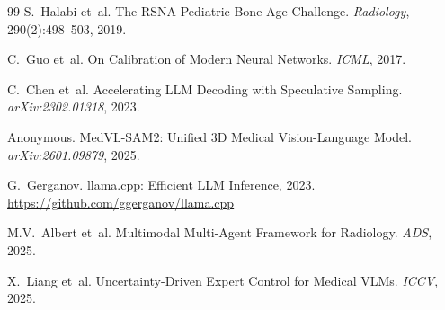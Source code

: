 \documentclass[10pt,twocolumn]{article}
\begin{document}
\begin{thebibliography}{99}
S.~Halabi et~al.
The RSNA Pediatric Bone Age Challenge.
\emph{Radiology}, 290(2):498--503, 2019.

C.~Guo et~al.
On Calibration of Modern Neural Networks.
\emph{ICML}, 2017.

C.~Chen et~al.
Accelerating LLM Decoding with Speculative Sampling.
\emph{arXiv:2302.01318}, 2023.

Anonymous.
MedVL-SAM2: Unified 3D Medical Vision-Language Model.
\emph{arXiv:2601.09879}, 2025.

G.~Gerganov.
llama.cpp: Efficient LLM Inference, 2023.
\url{https://github.com/ggerganov/llama.cpp}

M.V.~Albert et~al.
Multimodal Multi-Agent Framework for Radiology.
\emph{ADS}, 2025.

X.~Liang et~al.
Uncertainty-Driven Expert Control for Medical VLMs.
\emph{ICCV}, 2025.

\end{thebibliography}
\end{document}

